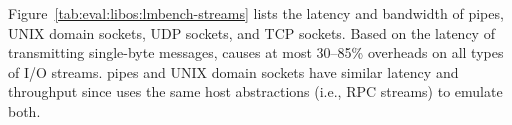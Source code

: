 \label{sec:eval:libos:streams}


\begin{table}[t!b!]

\caption{Network socket and pipe performance based on \lmbench{}. Comparison is among (1) native Linux processes; (2) \graphene{} on Linux host, both without and with \seccomp{} filter ({\bf +SC}) and reference monitor ({\bf +RM}); (3) \graphenesgx{}.
System call latency is in microseconds, and lower is better.
System call bandwidth is in megabytes per second, and higher is better. 
Overheads are relative to Linux; negative overheads indicate improvement.} 
\label{tab:eval:libos:lmbench-streams}
\end{table}


Figure~\ref{tab:eval:libos:lmbench-streams}
lists the latency and bandwidth of pipes, UNIX domain sockets, UDP sockets, and TCP sockets.
Based on the latency of transmitting single-byte messages, 
\graphene{} causes at most 30--85\% overheads
on all types of I/O streams.
pipes and UNIX domain sockets have similar latency and throughput since \thelibos{} uses the same host abstractions (i.e., RPC streams) to emulate both.

 
